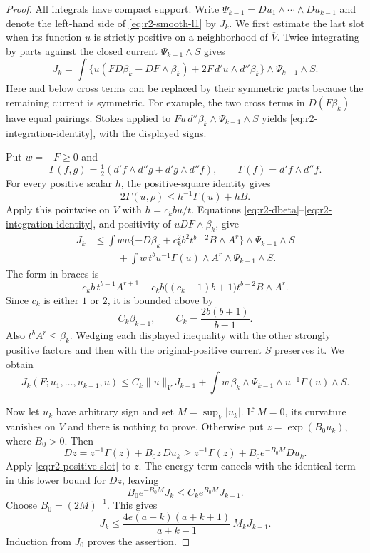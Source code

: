 \documentclass[11pt,a4paper]{article}
\numberwithin{equation}{section}
\theoremstyle{definition}
\theoremstyle{remark}
\begin{document}
\begin{proof}
All integrals have compact support. Write
$\Psi_{k-1}=Du_1\wedge\cdots\wedge Du_{k-1}$ and denote the
left-hand side of \eqref{eq:r2-smooth-l1} by $J_k$.
We first estimate the last slot when its function $u$ is strictly
positive on a neighborhood of $\overline V$. Twice integrating by
parts against the closed current $\Psi_{k-1}\wedge S$ gives
\begin{equation}
\label{eq:r2-integration-identity}
 J_k
 =\int\bigl\{u(FD\beta_k-DF\wedge\beta_k)
              +2F\,d'u\wedge d''\beta_k\bigr\}
                       \wedge\Psi_{k-1}\wedge S.
\end{equation}
Here and below cross terms can be replaced by their symmetric parts
because the remaining current is symmetric. For example, the two
cross terms in $D(F\beta_k)$ have equal pairings. Stokes applied to
$Fu\,d''\beta_k\wedge\Psi_{k-1}\wedge S$ yields
\eqref{eq:r2-integration-identity}, with the displayed signs.

Put $w=-F\geq0$ and
\[
 \Gamma(f,g)=\tfrac12(d'f\wedge d''g+d'g\wedge d''f),
 \qquad \Gamma(f)=d'f\wedge d''f.
\]
For every positive scalar $h$, the positive-square identity gives
\[
 2\Gamma(u,\rho)\leq h^{-1}\Gamma(u)+hB.
\]
Apply this pointwise on $V$ with $h=c_kbu/t$. Equations
\eqref{eq:r2-dbeta}--\eqref{eq:r2-integration-identity}, and
positivity of $uDF\wedge\beta_k$, give
\begin{align*}
 J_k
 &\leq\int wu\{-D\beta_k+c_k^2b^2t^{b-2}B\wedge A^r\}
                          \wedge\Psi_{k-1}\wedge S\\
 &\hspace{1cm}
       +\int w\,t^b u^{-1}\Gamma(u)\wedge A^r
                          \wedge\Psi_{k-1}\wedge S.
\end{align*}
The form in braces is
\[
 c_kb\,t^{b-1}A^{r+1}
  +c_kb\bigl((c_k-1)b+1\bigr)t^{b-2}B\wedge A^r.
\]
Since $c_k$ is either $1$ or $2$, it is bounded above by
\[
 C_k\beta_{k-1},\qquad
 C_k=\frac{2b(b+1)}{b-1}.
\]
Also $t^bA^r\leq\beta_k$. Wedging each displayed inequality with
the other strongly positive factors and then with the
original-positive current $S$ preserves it. We obtain
\begin{equation}
\label{eq:r2-positive-slot}
 J_k(F;u_1,\ldots,u_{k-1},u)
 \leq C_k\|u\|_{V}J_{k-1}
       +\int w\,\beta_k\wedge\Psi_{k-1}\wedge
                          u^{-1}\Gamma(u)\wedge S.
\end{equation}

Now let $u_k$ have arbitrary sign and set $M=\sup_V|u_k|$.
If $M=0$, its curvature vanishes on $V$ and there is nothing to
prove. Otherwise put $z=\exp(B_0u_k)$, where $B_0>0$. Then
\[
 Dz=z^{-1}\Gamma(z)+B_0z\,Du_k
       \geq z^{-1}\Gamma(z)+B_0e^{-B_0M}Du_k.
\]
Apply \eqref{eq:r2-positive-slot} to $z$. The energy term cancels
with the identical term in this lower bound for $Dz$, leaving
\[
 B_0e^{-B_0M}J_k\leq C_ke^{B_0M}J_{k-1}.
\]
Choose $B_0=(2M)^{-1}$. This gives
\[
 J_k\leq\frac{4e(a+k)(a+k+1)}{a+k-1}\,M_kJ_{k-1}.
\]
Induction from $J_0$ proves the assertion.
\end{proof}
\end{document}
